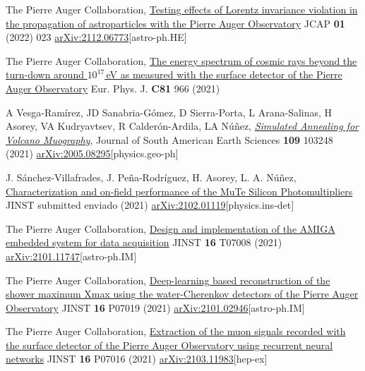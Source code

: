 \begin{etaremune}

\item {}The Pierre Auger Collaboration, \href{https://doi.org/10.1088/1475-7516/2022/01/023}{Testing effects of Lorentz invariance violation in the propagation of astroparticles with the Pierre Auger Observatory} JCAP {\bf{01}} (2022) 023 \href{https://arxiv.org/abs/2112.06773}{arXiv:2112.06773}[astro-ph.HE]

\item {}The Pierre Auger Collaboration, \href{https://doi.org/10.1140/epjc/s10052-021-09700-w}{The energy spectrum of cosmic rays beyond the turn-down around $10^{17}$\,eV as measured with the surface detector of the Pierre Auger Observatory} Eur. Phys. J. {\bf{C81}} 966 (2021)

\item {} A Vesga-Ramírez, JD Sanabria-Gómez, D Sierra-Porta, L Arana-Salinas, H Asorey, VA Kudryavtsev, R Calderón-Ardila, LA Núñez, \href{https://doi.org/10.1016/j.jsames.2021.103248}{\emph{Simulated Annealing for Volcano Muography}}, Journal of South American Earth Sciences {\bf{109}} 103248 (2021) \href{https://arxiv.org/abs/2005.08295}{arXiv:2005.08295}[physics.geo-ph]

\item {} J. Sánchez-Villafrades, J. Peña-Rodríguez, H. Asorey, L. A. Núñez, \href{}{Characterization and on-field performance of the MuTe Silicon Photomultipliers} JINST \ifeng submitted \else enviado \fi (2021) \href{https://arxiv.org/abs/2102.01119}{arXiv:2102.01119}[physics.ins-det]

\item {}The Pierre Auger Collaboration, \href{https://doi.org/10.1088/1748-0221/16/07/T07008}{Design and implementation of the AMIGA embedded system for data acquisition} JINST {\bf{16}} T07008 (2021) \href{https://arxiv.org/abs/2101.11747}{arXiv:2101.11747}[astro-ph.IM]

\item {}The Pierre Auger Collaboration, \href{https://doi.org/10.1088/1748-0221/16/07/P07019}{Deep-learning based reconstruction of the shower maximum Xmax using the water-Cherenkov detectors of the Pierre Auger Observatory} JINST {\bf{16}} P07019 (2021) \href{https://arxiv.org/abs/2101.02946}{arXiv:2101.02946}[astro-ph.IM]

\item {}The Pierre Auger Collaboration, \href{https://doi.org/10.1088/1748-0221/16/07/P07016}{Extraction of the muon signals recorded with the surface detector of the Pierre Auger Observatory using recurrent neural networks} JINST {\bf{16}} P07016 (2021) \href{https://arxiv.org/abs/2103.11983}{arXiv:2103.11983}[hep-ex]


\end{etaremune}
